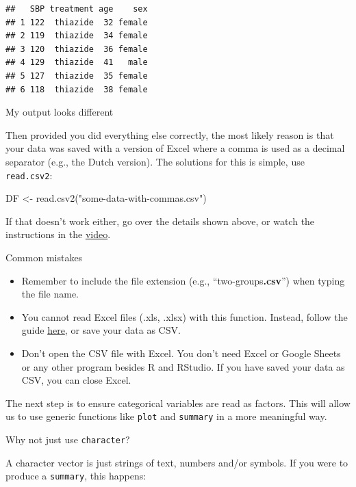 \documentclass[
]{book}
\newenvironment{Shaded}{\begin{snugshade}}{\end{snugshade}}
\newcommand{\FunctionTok}[1]{\textcolor[rgb]{0.00,0.00,0.00}{#1}}
\newcommand{\NormalTok}[1]{#1}
\newcommand{\OtherTok}[1]{\textcolor[rgb]{0.56,0.35,0.01}{#1}}
\newcommand{\SpecialCharTok}[1]{\textcolor[rgb]{0.00,0.00,0.00}{#1}}
\newcommand{\StringTok}[1]{\textcolor[rgb]{0.31,0.60,0.02}{#1}}
\providecommand{\tightlist}{%
  \setlength{\itemsep}{0pt}\setlength{\parskip}{0pt}}
\begin{document}
\begin{verbatim}
##   SBP treatment age    sex
## 1 122  thiazide  32 female
## 2 119  thiazide  34 female
## 3 120  thiazide  36 female
## 4 129  thiazide  41   male
## 5 127  thiazide  35 female
## 6 118  thiazide  38 female
\end{verbatim}

My output looks different

Then provided you did everything else correctly, the most likely reason is that your data was saved with a version of Excel where a comma is used as a decimal separator (e.g., the Dutch version). The solutions for this is simple, use \texttt{read.csv2}:

\begin{Shaded}
\begin{Highlighting}[]
\NormalTok{DF }\OtherTok{\textless{}{-}} \FunctionTok{read.csv2}\NormalTok{(}\StringTok{"some{-}data{-}with{-}commas.csv"}\NormalTok{)}
\end{Highlighting}
\end{Shaded}

If that doesn't work either, go over the details shown above, or watch the instructions in the \href{https://youtu.be/BGUqZc-Pb8w}{video}.

Common mistakes

\begin{itemize}
\tightlist
\item
  Remember to include the file extension (e.g., ``two-groups\textbf{.csv}'') when typing the file name.
\item
  You cannot read Excel files (.xls, .xlsx) with this function. Instead, follow the guide \protect\hyperlink{read}{here}, or save your data as CSV.
\item
  Don't open the CSV file with Excel. You don't need Excel or Google Sheets or any other program besides R and RStudio. If you have saved your data as CSV, you can close Excel.
\end{itemize}

The next step is to ensure categorical variables are read as factors. This will allow us to use generic functions like \texttt{plot} and \texttt{summary} in a more meaningful way.

Why not just use \texttt{character}?

A character vector is just strings of text, numbers and/or symbols. If you were to produce a \texttt{summary}, this happens:

\begin{Shaded}
\end{Shaded}
\end{document}
